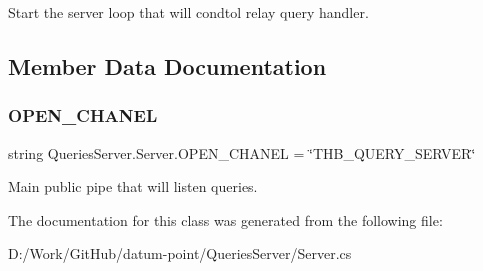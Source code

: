 Start the server loop that will condtol relay query handler. 



\subsection{Member Data Documentation}
\mbox{\label{class_queries_server_1_1_server_a5d7c4c9ababa7292ef7cac92005d3563}} 
\subsubsection{\texorpdfstring{O\+P\+E\+N\+\_\+\+C\+H\+A\+N\+EL}{OPEN\_CHANEL}}
{\footnotesize\ttfamily string Queries\+Server.\+Server.\+O\+P\+E\+N\+\_\+\+C\+H\+A\+N\+EL = \char`\"{}T\+H\+B\+\_\+\+Q\+U\+E\+R\+Y\+\_\+\+S\+E\+R\+V\+ER\char`\"{}\hspace{0.3cm}{\ttfamily [static]}}



Main public pipe that will listen queries. 



The documentation for this class was generated from the following file\+:\begin{DoxyCompactItemize}
\item 
D\+:/\+Work/\+Git\+Hub/datum-\/point/\+Queries\+Server/Server.\+cs\end{DoxyCompactItemize}
